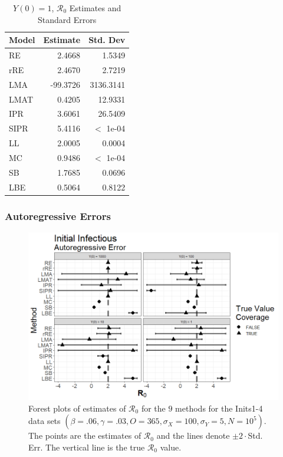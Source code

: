 \documentclass[12pt]{article}
\newcommand{\xxsir}{\ensuremath{9} } %
\newcommand{\rr}{\ensuremath{\mathcal{R}_0}}
\begin{document}
\begin{table}[H]
	
	\centering
	\begin{tabular}[t]{l|r|r}
		\hline
		Model & Estimate & Std. Dev\\
		\hline
		RE & 2.4668 & 1.5349\\
		\hline
		rRE & 2.4670 & 2.7219\\
		\hline
		LMA & -99.3726 & 3136.3141\\
		\hline
		LMAT & 0.4205 & 12.9331\\
		\hline
		IPR & 3.6061 & 26.5409\\
		\hline
		SIPR & 5.4116 & $<$ 1e-04\\
		\hline
		LL & 2.0005 & 0.0004\\
		\hline
		MC & 0.9486 & $<$ 1e-04\\
		\hline
		SB & 1.7685 & 0.0696\\
		\hline
		LBE & 0.5064 & 0.8122\\
		\hline
	\end{tabular}
	\caption{$Y(0) = 1$, $\rr$ Estimates and Standard Errors}
\end{table}


\subsubsection{Autoregressive Errors}

\begin{figure}[H]
	\centering
	\includegraphics[scale=0.5]{images/start_ar.tiff}
	\caption{Forest plots of estimates of $\rr$ for the \xxsir methods for the Inits1-4 data sets $(\beta=.06, \gamma=.03, O=365, \sigma_X=100, \sigma_Y=5, N=10^5)$.  The points are the estimates of $\rr$ and the lines denote $\pm 2\cdot $Std. Err.  The vertical line is the true $\rr$ value.}
\end{figure}
\end{document}
